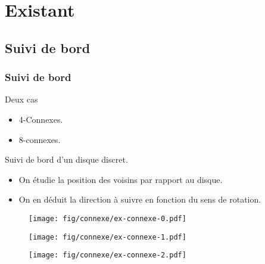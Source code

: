 \section{Existant}

\subsection{Suivi de bord}
\begin{frame}
  \frametitle{Suivi de bord}
    { 
      \begin{block}{Deux cas}
        \begin{itemize}
          \item 4-Connexes.
          \item 8-connexes.
        \end{itemize}
      \end{block} 
    } 
    {
      \begin{block}{Suivi de bord d'un disque discret.}
        \begin{itemize}
          \item On étudie la position des voisins par rapport au disque.
          \item<3> On en déduit la direction à suivre en fonction du sens de rotation.
        \end{itemize}
      \end{block} 
    }
    
    {   
      \begin{figure}[h!]
        \centering
        \texttt{[image: fig/connexe/ex-connexe-0.pdf]}
      \end{figure}    
    }
    {     
      \begin{figure}[h!]
        \centering
        \texttt{[image: fig/connexe/ex-connexe-1.pdf]}
      \end{figure}    
    }
    {     
      \begin{figure}[h!]
        \centering
        \texttt{[image: fig/connexe/ex-connexe-2.pdf]}
      \end{figure}    
    }
\end{frame}


